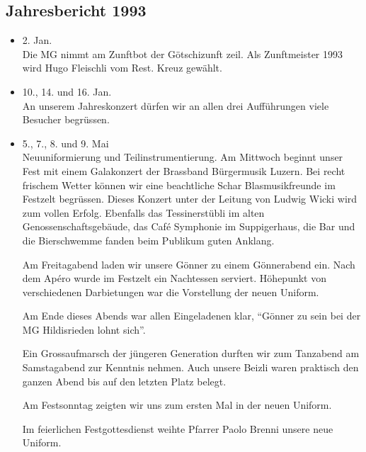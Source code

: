 \subsection{Jahresbericht 1993}

\begin{history}


    \begin{itemize}

        \item[]2. Jan.\\
        Die MG nimmt am Zunftbot der Götschizunft zeil. Als Zunftmeister 1993
        wird Hugo Fleischli vom Rest. Kreuz gewählt.

        \item[]10., 14. und 16. Jan.\\
        An unserem Jahreskonzert dürfen wir an allen drei Aufführungen viele
        Besucher begrüssen.

        \item[]5., 7., 8. und 9. Mai\\
        Neuuniformierung und Teilinstrumentierung. Am Mittwoch beginnt unser
        Fest mit einem Galakonzert der Brassband Bürgermusik Luzern. Bei recht
        frischem Wetter können wir eine beachtliche Schar Blasmusikfreunde im
        Festzelt begrüssen. Dieses Konzert unter der Leitung von Ludwig Wicki
        wird zum vollen Erfolg. Ebenfalls das Tessinerstübli im alten
        Genossenschaftsgebäude, das Café Symphonie im Suppigerhaus, die Bar und
        die Bierschwemme fanden beim Publikum guten Anklang.

        Am Freitagabend laden wir unsere Gönner zu einem Gönnerabend ein. Nach
        dem Apéro wurde im Festzelt ein Nachtessen serviert. Höhepunkt von
        verschiedenen Darbietungen war die Vorstellung der neuen Uniform.

        Am Ende dieses Abends war allen Eingeladenen klar, \enquote{Gönner zu sein
            bei der MG Hildisrieden lohnt sich}.

        Ein Grossaufmarsch der jüngeren Generation durften wir zum Tanzabend am
        Samstagabend zur Kenntnis nehmen. Auch unsere Beizli waren praktisch den
        ganzen Abend bis auf den letzten Platz belegt.

        Am Festsonntag zeigten wir uns zum ersten Mal in der neuen Uniform.

        Im feierlichen Festgottesdienst weihte Pfarrer Paolo Brenni unsere neue Uniform.


\end{itemize}
\end{history}
